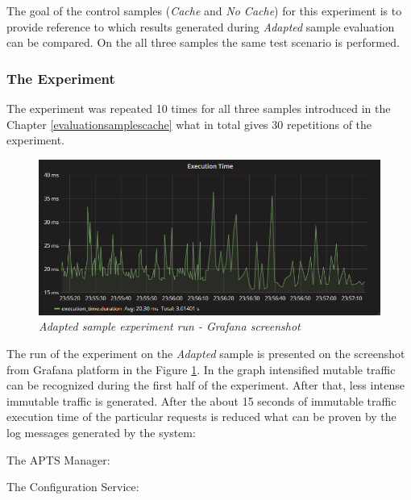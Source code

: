 \documentclass[10pt,a4paper]{article}
\begin{document}
The goal of the control samples (\textit{Cache} and \textit{No Cache}) for this experiment is to provide reference to which results generated during \textit{Adapted} sample evaluation can be compared. On the all three samples the same test scenario is performed. 



\subsubsection{The Experiment} 

The experiment was repeated 10 times for all three samples introduced in the Chapter \ref{evaluationsamplescache} what in total gives 30 repetitions of the experiment.

\begin{figure}[!htb]
\centering
\includegraphics[width=1\textwidth]{cacheEval2}
\caption{\textit{Adapted sample experiment run - Grafana screenshot}} \label{figure:cachegraphanascreen}
\end{figure}

The run of the experiment on the \textit{Adapted} sample is presented on the screenshot from Grafana platform in the Figure \ref{figure:cachegraphanascreen}. In the graph intensified mutable traffic can be recognized during the first half of the experiment. After that, less intense immutable traffic is generated. After the about 15 seconds of immutable traffic execution time of the particular requests is reduced what can be proven by the log messages generated by the system:

The APTS Manager:

\noindent{}\vspace{1mm}

The Configuration Service:
\end{document}
